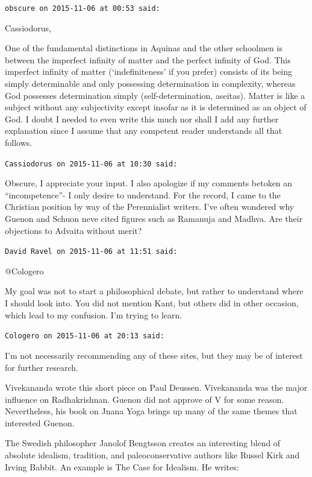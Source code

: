 \begin{footnotesize}
\begin{sffamily}
\hfill

\texttt{obscure on 2015-11-06 at 00:53 said:} 

Cassiodorus,

One of the fundamental distinctions in Aquinas and the other schoolmen is between the imperfect infinity of matter and
the perfect infinity of God. This imperfect infinity of matter (`indefiniteness' if you prefer)
consists of its being simply determinable and only possessing determination in complexity, whereas God possesses
determination simply (self-determination, aseitas). Matter is like a subject without any subjectivity except insofar as
it is determined as an object of God. I doubt I needed to even write this much nor shall I add any further explanation
since I assume that any competent reader understands all that follows.


\hfill

\texttt{Cassiodorus on 2015-11-06 at 10:30 said: }

Obscure, I appreciate your input. I also apologize if my comments betoken an “incompetence”- I only desire to
understand. For the record, I came to the Christian position by way of the Perennialist writers. I've often
wondered why Guenon and Schuon neve cited figures such as Ramanuja and Madhva. Are their objections to Advaita without
merit?


\hfill

\texttt{David Ravel on 2015-11-06 at 11:51 said: }

@Cologero

My goal was not to start a philosophical debate, but rather to understand where I should look into. You did not mention
Kant, but others did in other occasion, which lead to my confusion. I'm trying to learn.


\hfill

\texttt{Cologero on 2015-11-06 at 20:13 said: }

I'm not necessarily recommending any of these sites, but they may be of interest for further research.

Vivekananda wrote this short piece on Paul Deussen. Vivekananda was the major influence on Radhakrishnan. Guenon did not
approve of V for some reason. Nevertheless, his book on Jnana Yoga brings up many of the same themes that interested
Guenon.

The Swedish philosopher Janolof Bengtsson creates an interesting blend of absolute idealism, tradition, and
paleoconservative authors like Russel Kirk and Irving Babbit. An example is The Case for Idealism. He writes:


\end{sffamily}
\end{footnotesize}
